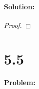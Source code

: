 \documentclass[12pt]{article}
\begin{document}
\begin{comment}
\begin{tikzpicture}[->,>=stealth',shorten >=1pt,auto,node distance=3cm,
  thick,main node/.style={circle,fill=blue!20,draw,font=\sffamily\Large\bfseries}]
  \node[main node] (a) {a};
  \node[main node] (b) [right of=a]{b};
  \node[main node] (c) [right of=b]{c};
  \node[main node] (d) [right of=c]{d};
  \node[main node] (e) [below of=a]{e};
  \node[main node] (f) [below of=b]{f};
  \node[main node] (g) [below of=c]{g};
  \node[main node] (h) [below of=d]{h};
  \tikzset{LabelStyle/.style =   {draw,
				  fill           = yellow,
				  text           = red}}
  \path[every node/.style={font=\sffamily\small}]
  \draw[EdgeStyle](a) to node[LabelStyle]{1} (b);
  \draw[EdgeStyle](a) to node[LabelStyle]{8} (f);
  \draw[EdgeStyle](a) to node[LabelStyle]{4} (e);
  \draw[EdgeStyle](b) to node[LabelStyle]{2} (c);
  \draw[EdgeStyle](b) to node[LabelStyle]{6} (g);
  \draw[EdgeStyle](b) to node[LabelStyle]{6} (f);
  \draw[EdgeStyle](c) to node[LabelStyle]{3} (d);
  \draw[EdgeStyle](c) to node[LabelStyle]{2} (g);
  \draw[EdgeStyle](d) to node[LabelStyle]{1} (g);
  \draw[EdgeStyle](d) to node[LabelStyle]{4} (h);
  \draw[EdgeStyle](e) to node[LabelStyle]{5} (f);
  \draw[EdgeStyle](f) to node[LabelStyle]{1} (g);
  \draw[EdgeStyle](g) to node[LabelStyle]{1} (h);
\end{tikzpicture}
(a) Run Prim’s algorithm; whenever there is a choice of nodes, always use alphabetic ordering
(e.g., start from node A). Draw a table showing the intermediate values of the cost array.
(b) Run Kruskal’s algorithm on the same graph. Show how the disjoint-sets data structure
looks at every intermediate stage (including the structure of the directed trees), assuming
path compression is used.
\end{comment}

\paragraph{Solution:}
\begin{proof}
\end{proof}


\section*{5.5}
\paragraph{Problem:}
\end{document}
